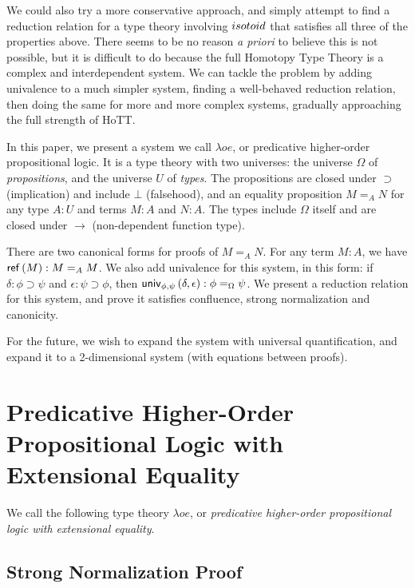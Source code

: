 We could also try a more conservative approach, and simply attempt to find a reduction relation for a type theory involving $isotoid$ that satisfies
all three of the properties above.  There seems to be no reason \emph{a priori} to believe this is not possible, but it is difficult to do because
the full Homotopy Type Theory is a complex and interdependent system.  We can tackle the problem by adding univalence to a much simpler system, finding
a well-behaved reduction relation, then doing the same for more and more complex systems, gradually approaching the full strength of HoTT.

In this paper, we present a system we call $\lambda o e$, or predicative higher-order propositional logic.  It is a type theory with two universes: the universe $\Omega$
of \emph{propositions}, and the universe $U$ of \emph{types}.  The propositions are closed under $\supset$ (implication) and include $\bot$ (falsehood), and an equality proposition $M =_A N$ for
any type $A : U$ and terms $M : A$ and $N : A$.  The types include $\Omega$ itself and are closed under $\rightarrow$ (non-dependent function type).

There are two canonical forms for proofs of $M =_A N$.  For any term $M : A$, we have $\mathsf{ref} \left( {M} \right) : M =_A M$.  We also add univalence for this system, in this form:
if $\delta : \phi \supset \psi$ and $\epsilon : \psi \supset\phi$, then $\mathsf{univ}_{{\phi} , {\psi}} \left( {\delta} , {\epsilon} \right) : \phi =_\Omega \psi$.  We present a reduction relation for this system, and prove it satisfies confluence, strong normalization and canonicity. 

For the future, we wish to expand the system with universal quantification, and expand it to a 2-dimensional system (with equations between proofs).


\section{Predicative Higher-Order Propositional Logic with Extensional Equality}

We call the following type theory $\lambda o e$, or \emph{predicative higher-order propositional logic with extensional equality}.  







\subsection{Strong Normalization Proof}

